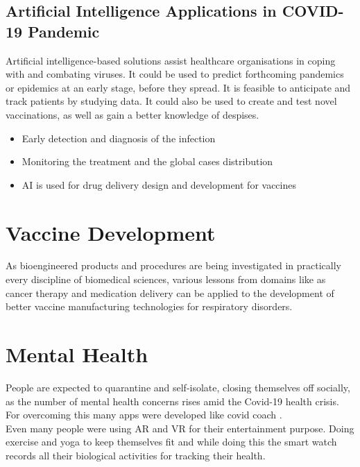 \documentclass[12pt]{article}
\begin{document}
\subsection* { \Large Artificial Intelligence Applications in COVID-19 Pandemic }
\vspace{3mm}
Artificial intelligence-based solutions assist healthcare organisations in coping with and combating viruses. It could be used to predict forthcoming pandemics or epidemics at an early stage, before they spread. It is feasible to anticipate and track patients by studying data. It could also be used to create and test novel vaccinations, as well as gain a better knowledge of despises.
\begin{itemize}
\item Early detection and diagnosis of the infection
\item Monitoring the treatment and the global cases distribution
\item AI is used for drug delivery design and development for vaccines

\end{itemize}
\section*{ \LARGE Vaccine Development }
\Large 
As bioengineered products and procedures are being investigated in practically every discipline of biomedical sciences, various lessons from domains like as cancer therapy and medication delivery can be applied to the development of better vaccine manufacturing technologies for respiratory disorders.

\section*{\LARGE Mental Health }
\Large
People are expected to quarantine and self-isolate, closing themselves off socially, as the number of mental health concerns rises amid the Covid-19 health crisis.\\
 For overcoming this many apps were developed like covid coach .\\
Even many people were using AR and VR for their entertainment purpose.
Doing exercise and yoga to keep themselves fit and while doing this the  smart watch records all their biological activities for tracking their health. 
\end{document}
